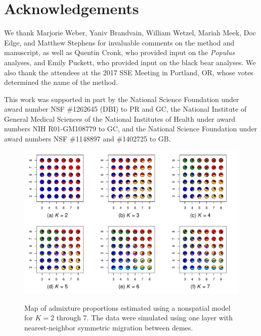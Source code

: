 \documentclass[10pt,letterpaper]{article}
\newif\ifsubmissionversion
\newif\ifincludesupplement
\newif\iffloatsatend
\begin{document}
\section*{Acknowledgements}

We thank Marjorie Weber, Yaniv Brandvain, William Wetzel, 
Mariah Meek, Doc Edge, and Matthew Stephens 
for invaluable comments on the method and manuscript, 
as well as Quentin Cronk, who provided input on the \textit{Populus} analyses, 
and Emily Puckett, who provided input on the black bear analyses.
We also thank the attendees at the 2017 SSE Meeting in Portland, OR, 
whose votes determined the name of the method.
\ifsubmissionversion
\else
This work was supported in part by 
the National Science Foundation under award number NSF \#1262645 (DBI) to PR and GC, 
the National Institute of General Medical Sciences of the National
Institutes of Health under award numbers NIH R01-GM108779 to GC,
and the National Science Foundation under award numbers NSF \#1148897 and \#1402725 to GB.
\fi


\newpage
\clearpage



\ifincludesupplement

\clearpage
\newpage
\section*{Supplementary Information}
\renewcommand{\theequation}{S\arabic{equation}}
\setcounter{equation}{0}
\renewcommand{\thetable}{S\arabic{table}}
\setcounter{table}{0}
\renewcommand{\thefigure}{S\arabic{figure}}
\setcounter{figure}{0}

\iffloatsatend
\processdelayedfloats
\fi


\begin{figure}[h]
	\centering
		{\includegraphics[width=\textwidth]{figs/sims/simK1_nsp_pies.pdf}}
	\caption{
	Map of admixture proportions estimated using a nonspatial model for $K=2$ through 7.
	The data were simulated using one layer with nearest-neighbor symmetric migration between demes.
    }\label{simK1_nsp_pies}
\end{figure}
\end{document}
